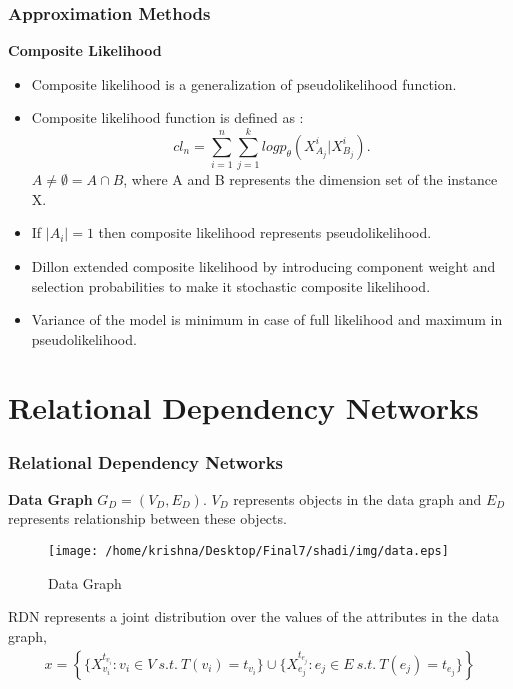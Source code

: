 \documentclass[10pt, blue,subsection=true, compress]{beamer}
\begin{document}
\begin{frame}\frametitle{Approximation Methods}
\begin{block}{\textbf{Composite Likelihood}}
\begin{itemize}
\item Composite likelihood is a generalization of pseudolikelihood function.
\item Composite likelihood function  is defined as :
\begin{equation}
\label{comp}
 cl_n = \sum_{i=1}^n \sum_{j=1}^k log p_{\theta}(X_{A_j}^i | X_{{B_j}}^i). 
\end{equation}
$A \neq \emptyset = A \cap B$, 
where A and B represents the dimension set of the instance X.  
\item If $|A_i| =1$ then composite likelihood represents pseudolikelihood. 
\item Dillon extended composite likelihood by introducing component weight and selection probabilities to make it stochastic composite likelihood.
\item Variance of the model is minimum in case of full likelihood and maximum in pseudolikelihood.
\end{itemize}
\end{block}

\end{frame}

\section{Relational Dependency Networks}
\begin{frame}\frametitle{Relational Dependency Networks}
\textbf{Data Graph}
$G_D = (V_D , E_D)$. $V_D$ represents objects in the data graph and $E_D$ represents relationship between these objects.
\begin{figure}[htbp]
\centering
\texttt{[image: /home/krishna/Desktop/Final7/shadi/img/data.eps]}
\caption{Data Graph}
\label{fig:3.2}
\end{figure}
RDN represents a joint distribution over the values of the attributes in the data graph, 
\begin{align}
\nonumber  x = \left\{\{X_{v_i}^{t_{v_i}} : v_i \in V~ s.t. ~T(v_i) = t_{v_i}\}  \cup \{X_{e_j}^{t_{e_j}} : e_j \in E ~s.t.~ T(e_j) = t_{e_j} \}\right\}
\end{align}



\end{frame}
\end{document}
